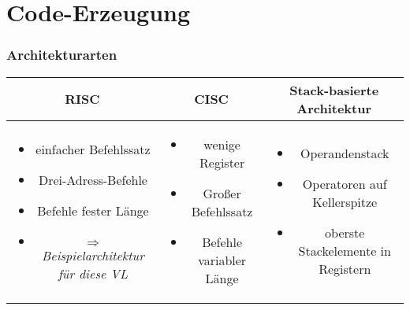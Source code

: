 \chapter{Code-Erzeugung}
\subsection{Architekturarten}
\begin{tabular}{c|c|c}
 RISC & CISC & Stack-basierte Architektur \\\hline
 \begin{minipage}{0.3\linewidth}
  \begin{itemize}
   \item einfacher Befehlssatz
   \item Drei-Adress-Befehle
   \item Befehle fester Länge
   \item \emph{$\Rightarrow$ Beispielarchitektur für diese VL}
  \end{itemize}
 \end{minipage} &
 \begin{minipage}{0.3\linewidth}
  \begin{itemize}
   \item wenige Register
   \item Großer Befehlssatz
   \item Befehle variabler Länge
  \end{itemize}
 \end{minipage} &
 \begin{minipage}{0.3\linewidth}
  \begin{itemize}
   \item Operandenstack
   \item Operatoren auf Kellerspitze
   \item oberste Stackelemente in Registern
  \end{itemize}
 \end{minipage}
\end{tabular}


